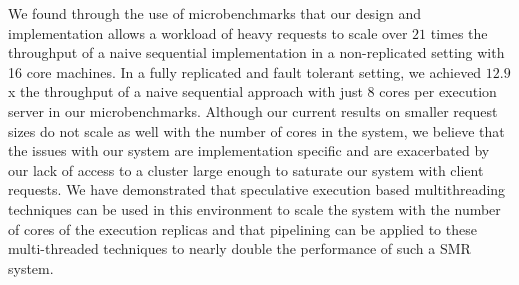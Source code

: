 \documentclass[11pt, oneside]{report}
\begin{document}
We found through the use of microbenchmarks that our design and implementation allows a workload of heavy requests to scale over $21$ times the throughput of a naive sequential implementation in a non-replicated setting with 16 core machines.
In a fully replicated and fault tolerant setting, we achieved $12.9$x the throughput of a naive sequential approach with just 8 cores per execution server in our microbenchmarks.
Although our current results on smaller request sizes do not scale as well with the number of cores in the system, we believe that the issues with our system are implementation specific and are exacerbated by our lack of access to a cluster large enough to saturate our system with client requests.
We have demonstrated that speculative execution based multithreading techniques can be used in this environment to scale the system with the number of cores of the execution replicas and that pipelining can be applied to these multi-threaded techniques to nearly double the performance of such a SMR system.



\end{document}

